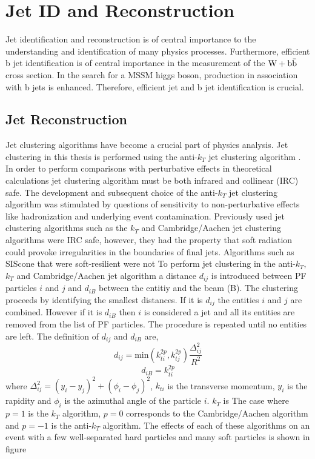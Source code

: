 \section{Jet ID and Reconstruction}
Jet identification and reconstruction is of central importance to the understanding
and identification of many physics processes. Furthermore, efficient b jet 
identification is of central importance
in the measurement of the $\mathrm{W+\mathrm{b\bar{b}}}$ cross section.  
In the search for a MSSM higgs boson, production in association with b jets
is enhanced. Therefore, efficient jet and b jet identification is crucial.
\subsection{Jet Reconstruction}
Jet clustering algorithms have become a crucial part of physics analysis.
Jet clustering in this thesis is performed using 
the anti-$k_{T}$ jet clustering algorithm \cite{Cacciari:2008gp}.
In order to perform %
comparisons with perturbative effects in theoretical calculations jet clustering algorithm
must be both infrared and collinear (IRC) safe. %
The development and subsequent choice of the anti-$k_{T}$ jet clustering algorithm
was stimulated by questions of sensitivity to non-perturbative effects like hadronization
and underlying event contamination. Previously used jet clustering algorithms
such as the $k_{T}$ %
and Cambridge/Aachen %
jet clustering algorithms were IRC safe, however, they
had the property that soft radiation could provoke irregularities in the boundaries
of final jets. 
Algorithms such as SIScone %
that were soft-resilient were not %
To perform jet clustering in the anti-$k_{T}$, $k_{T}$ and Cambridge/Aachen jet algorithm
a distance $d_{ij}$ is introduced between PF particles $i$ and $j$ and $d_{iB}$ between
the entitiy and the beam (B). The clustering proceeds by identifying the smallest distances.
If it is $d_{ij}$ the entities $i$ and $j$ are combined. However if it is $d_{iB}$ then $i$ 
is considered a jet and all its entities are removed from the list of PF particles. The procedure
is repeated until no entities are left. The definition of $d_{ij}$ and $d_{iB}$ are,
\begin{equation}
d_{ij}=\mathrm{min}(k_{ti}^{2p},k_{tj}^{2p})\frac{\Delta^{2}_{ij}}{R^{2}}
\end{equation}
\begin{equation}
d_{iB}=k_{ti}^{2p}
\end{equation}
where $\Delta_{ij}^{2}=(y_{i}-y_{j})^{2}+(\phi_{i}-\phi_{j})^{2}$, $k_{ti}$ is the 
transverse momentum, $y_{i}$ is the rapidity and $\phi_{i}$ is the azimuthal angle of 
the particle $i$. 
$k_{T}$ is %
The case where $p=1$ is the $k_{T}$ algorithm, $p=0$ corresponds to the Cambridge/Aachen
algorithm and $p=-1$ is the anti-$k_{T}$ algorithm.
The effects of each of these algorithms on an event with a few well-separated hard particles
and many soft particles is shown in figure%

